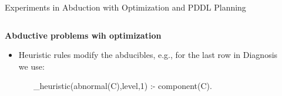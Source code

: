 \documentclass[final,hyperref={pdfpagelabels=false}]{beamer}
\newcommand{\dosubtitlesimple}[1]{\textbf{#1} \bigskip }
\begin{document}
\begin{frame}
\begin{columns}[t]
\end{columns}

\vskip70pt
\begin{columns}[t]

  \begin{column}{.055\textwidth}\end{column}

  \begin{column}{.582\textwidth}
    
    \begin{block}{Experiments in Abduction with Optimization and PDDL Planning} 

    \begin{columns}[t]

      \begin{column}{.50\textwidth}

	\dosubtitlesimple{Abductive problems wih optimization}

	\begin{itemize}
	  \item Heuristic rules modify the abducibles, e.g., for the last row in Diagnosis we use:
	\end{itemize}
	
	\begin{semiverbatim}
	  \ \ \ \ \ \ \ \_heuristic(abnormal(C),level,1) :- component(C).
	\end{semiverbatim}

	\bigskip %


\end{column}
\end{columns}
\end{block}
\end{column}
\end{columns}
\end{frame}
\end{document}
